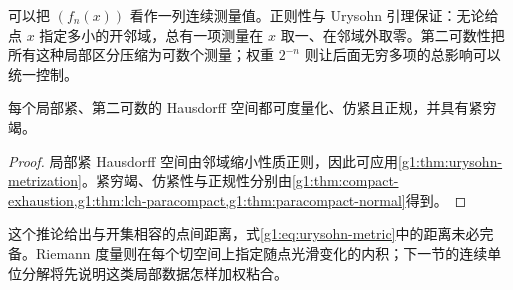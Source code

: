 可以把 \((f_n(x))\) 看作一列连续测量值。正则性与 Urysohn 引理保证：无论给点 \(x\) 指定多小的开邻域，总有一项测量在 \(x\) 取一、在邻域外取零。第二可数性把所有这种局部区分压缩为可数个测量；权重 \(2^{-n}\) 则让后面无穷多项的总影响可以统一控制。

\begin{corollary}\label{g1:cor:lch-second-countable}
	每个局部紧、第二可数的 Hausdorff 空间都可度量化、仿紧且正规，并具有紧穷竭。
\end{corollary}
\begin{proof}
	局部紧 Hausdorff 空间由邻域缩小性质正则，因此可应用\cref{g1:thm:urysohn-metrization}。紧穷竭、仿紧性与正规性分别由\cref{g1:thm:compact-exhaustion,g1:thm:lch-paracompact,g1:thm:paracompact-normal}得到。
\end{proof}

这个推论给出与开集相容的点间距离，式\eqref{g1:eq:urysohn-metric}中的距离未必完备。Riemann 度量则在每个切空间上指定随点光滑变化的内积；下一节的连续单位分解将先说明这类局部数据怎样加权粘合。
